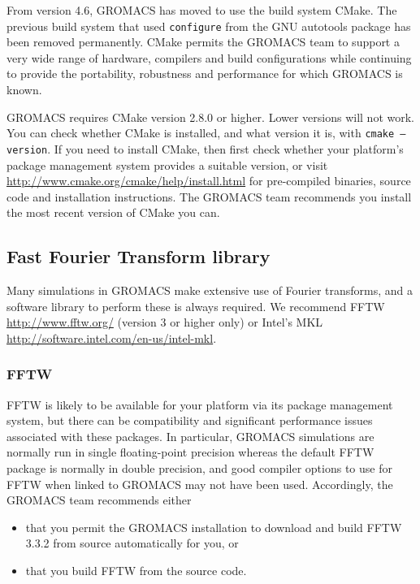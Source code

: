 \documentclass{article}[12pt,a4paper,twoside]
\newcommand{\gromacs}{GROMACS}
\newcommand{\fftw}{FFTW}
\newcommand{\mkl}{MKL}
\newcommand{\cmake}{CMake}
\newcommand{\fftwversion}{3.3.2}
\newcommand{\cmakeversion}{2.8.0}
\begin{document}
From version 4.6, \gromacs{} has moved to use the build system
\cmake{}. The previous build system that used \texttt{configure} from
the GNU autotools package has been removed permanently. \cmake{}
permits the \gromacs{} team to support a very wide range of hardware,
compilers and build configurations while continuing to provide the
portability, robustness and performance for which \gromacs{} is known.

\gromacs{} requires \cmake{} version \cmakeversion{} or higher. Lower
versions will not work. You can check whether \cmake{} is installed,
and what version it is, with \texttt{cmake --version}. If you need to
install \cmake{}, then first check whether your platform's package
management system provides a suitable version, or visit
\url{http://www.cmake.org/cmake/help/install.html} for pre-compiled
binaries, source code and installation instructions. The \gromacs{}
team recommends you install the most recent version of \cmake{} you
can.

\subsection{Fast Fourier Transform library}

Many simulations in \gromacs{} make extensive use of Fourier transforms,
and a software library to perform these is always required. We
recommend \fftw{} \url{http://www.fftw.org/} (version 3 or higher
only) or Intel's \mkl{}
\url{http://software.intel.com/en-us/intel-mkl}.

\subsubsection{\fftw{}}

\fftw{} is likely to be available for your platform via its package
management system, but there can be compatibility and significant
performance issues associated with these packages. In particular,
\gromacs{} simulations are normally run in single floating-point
precision whereas the default \fftw{} package is normally in double
precision, and good compiler options to use for \fftw{} when linked to
\gromacs{} may not have been used. Accordingly, the \gromacs{} team
recommends either
\begin{itemize}
\item that you permit the \gromacs{} installation to download and
  build \fftw{} \fftwversion{} from source automatically
  for you, or
\item that you build \fftw{} from the source code.
\end{itemize}
\end{document}
